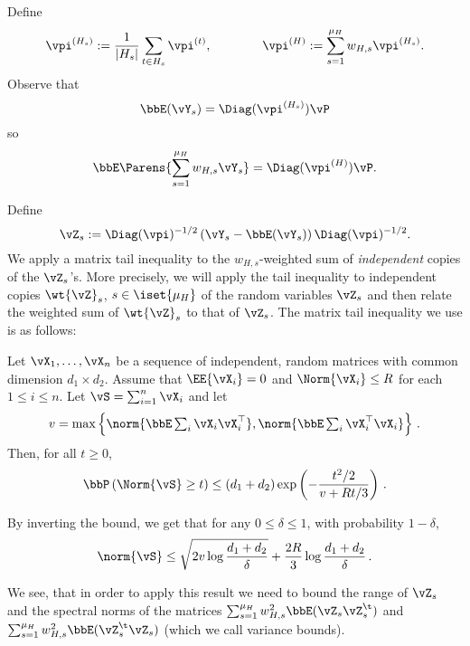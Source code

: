 Define%
\begin{align*}
  \vpi^{(H_s)}  := \frac1{|H_s|} \sum_{t \in H_s} \vpi^{(t)} , \qquad \qquad
  \vpi^{(H)}  := \sum_{s=1}^{\mu_H} w_{H,s} \vpi^{(H_s)} .
\end{align*}
Observe that
\[
  \bbE(\vY_s)
  = \Diag(\vpi^{(H_s)}) \vP
\]
so
\[
  \bbE\Parens{
    \sum_{s=1}^{\mu_H} w_{H,s} \vY_s
  } = \Diag(\vpi^{(H)}) \vP
  .
\]

Define
\[
  \vZ_s
  := \Diag(\vpi)^{-1/2} \left( \vY_s 
  - \bbE(\vY_s) \right)\Diag(\vpi)^{-1/2}
  .
\]
We apply a matrix tail inequality to the
$w_{H,s}$-weighted sum of \emph{independent} copies of the $\vZ_s$'s.
More precisely, we will apply the tail inequality to independent copies $\wt{\vZ}_s$, $s\in \iset{\mu_H}$ 
of the random variables $\vZ_s$ and then relate the weighted sum of $\wt{\vZ}_s$ to that of $\vZ_s$.
The matrix tail inequality we use is as follows:
\begin{theorem}
\label{thm:mxbernstein}
Let $\vX_1,\dots,\vX_n$ be a sequence of independent, random matrices with common dimension $d_1\times d_2$.
Assume that $\EE{\vX_i} = 0$ and $\Norm{\vX_i}\le R$ for each $1\le i \le n$. Let $\vS = \sum_{i=1}^n \vX_i$ and let 
\begin{align*}
v = \max\left\{ \norm{\bbE \textstyle\sum_i \vX_i \vX_i^\top  }, 
						      \norm{\bbE \textstyle\sum_i \vX_i^\top \vX_i  }
			\right\}\,.
\end{align*}
Then, for all $t\ge 0$, 
\[
\bbP\left( \Norm{\vS} \ge t \right) \le (d_1 + d_2) \exp\left( -\frac{t^2/2}{v+R t/3}\right)\,.
\]
\end{theorem}
By inverting the bound, we get that for any $0\le \delta \le 1$, with probability $1-\delta$, 
\[
\norm{\vS} \le \sqrt{2 v \log \frac{d_1+d_2}{\delta}} + \frac{2R}{3} \log\frac{d_1+d_2}{\delta}\,.
\]

We see, that in order to apply this result we need to bound the range of $\vZ_s$ and 
the spectral norms of the matrices $\sum_{s=1}^{\mu_H}
w_{H,s}^2 \bbE(\vZ_s \vZ_s^\t)$ and $\sum_{s=1}^{\mu_H} w_{H,s}^2
\bbE(\vZ_s^\t \vZ_s)$ (which we call variance bounds).

